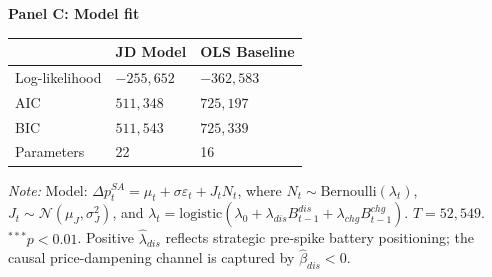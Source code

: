 \documentclass[12pt,a4paper]{article}
\begin{document}
\begin{table}[htbp]
\begin{threeparttable}
    \vspace{8pt}
    \textbf{Panel C: Model fit}\\[4pt]
    \begin{tabular}{lR{3.0cm}R{3.0cm}}
      \toprule
      & JD Model & OLS Baseline \\
      \midrule
      Log-likelihood  & $-255{,}652$ & $-362{,}583$ \\
      AIC             & $511{,}348$  & $725{,}197$  \\
      BIC             & $511{,}543$  & $725{,}339$  \\
      Parameters      & 22           & 16           \\
      \bottomrule
    \end{tabular}

    \begin{tablenotes}
      \small
      \item \textit{Note:} Model: $\Delta p^{SA}_t = \mu_t + \sigma\varepsilon_t + J_t N_t$,
        where $N_t \sim \mathrm{Bernoulli}(\lambda_t)$,
        $J_t \sim \mathcal{N}(\mu_J, \sigma_J^2)$, and
        $\lambda_t = \mathrm{logistic}(\lambda_0 + \lambda_{dis} B^{dis}_{t-1} + \lambda_{chg} B^{chg}_{t-1})$.
        $T = 52{,}549$.  $^{***}p<0.01$.
        Positive $\hat\lambda_{dis}$ reflects strategic pre-spike battery positioning;
        the causal price-dampening channel is captured by $\hat\beta_{dis} < 0$.
    \end{tablenotes}
  \end{threeparttable}
\end{table}
\end{document}

